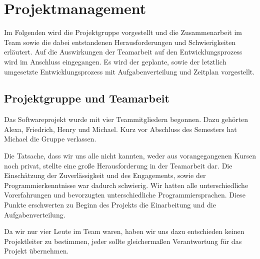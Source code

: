 \section{Projektmanagement}
\label{sec:projektmanagement}

Im Folgenden wird die Projektgruppe vorgestellt und die Zusammenarbeit im Team sowie die dabei entstandenen Herausforderungen und Schwierigkeiten erläutert. Auf die Auswirkungen der Teamarbeit auf den Entwicklungsprozess wird im Anschluss eingegangen. Es wird der geplante, sowie der letztlich umgesetzte Entwicklungsprozess mit Aufgabenverteilung und Zeitplan vorgestellt.

\subsection{Projektgruppe und Teamarbeit}
\label{subsec:teammitglieder}

Das Softwareprojekt wurde mit vier Teammitgliedern begonnen. Dazu gehörten Alexa, Friedrich, Henry und Michael. Kurz vor Abschluss des Semesters hat Michael die Gruppe verlassen.

Die Tatsache, dass wir uns alle nicht kannten, weder aus vorangegangenen Kursen noch privat, stellte eine große Herausforderung in der Teamarbeit dar. Die Einschätzung der Zuverlässigkeit und des Engagements, sowie der Programmierkenntnisse war dadurch schwierig. Wir hatten alle unterschiedliche Vorerfahrungen und bevorzugten unterschiedliche Programmiersprachen. Diese Punkte erschwerten zu Beginn des Projekts die Einarbeitung und die Aufgabenverteilung.

Da wir nur vier Leute im Team waren, haben wir uns dazu entschieden keinen Projektleiter zu bestimmen, jeder sollte gleichermaßen Verantwortung für das Projekt übernehmen.


